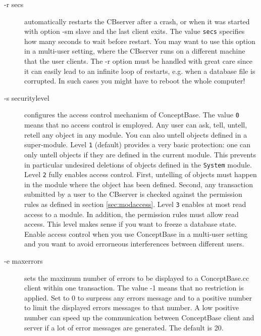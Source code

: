 \begin{description}
\item[-r secs] automatically restarts the CBserver after a crash, or when it was
started with option -sm slave and the last client exits.
The value {\tt secs} specifies how many seconds to wait before restart.
You may want to use this option in a multi-user setting, where the CBserver
runs on a different machine that the user clients. The -r option must be handled with
great care since it can easily lead to an infinite loop of restarts, e.g. when
a database file is corrupted. In such cases you might have to reboot the whole computer!


\item[-s securitylevel] configures the access control mechanism of
ConceptBase. The value {\tt 0} means that no access control is employed.
Any user can ask, tell, untell, retell any object in any module. You
can also untell objects defined in a super-module.
Level {\tt 1} (default)  provides a very basic protection: one can only
untell objects if they are defined in the current module. This
prevents in particular undesired deletions of objects defined in
the {\tt System} module.
Level {\tt 2} fully enables access control. First, untelling of objects must
happen in the module where the object has been defined. Second, any
transaction submitted by a user to the CBserver is checked against the
permission rules as defined in section \ref{sec:modaccess}.
Level {\tt 3} enables at most read access to a module. In addition, the permission rules
must allow read access. This level makes sense if you want to freeze a database state.
Enable access control
when you use ConceptBase in a multi-user setting and you want to avoid errorneous
interferences between different users.

\item[-e maxerrors] sets the maximum number of errors to be displayed to a ConceptBase.cc
client within one transaction. The value -1 means that no restriction is applied.
Set to 0 to surpress any errors message and to a positive number to limit the
displayed errors messages to that number. A low positive number can speed up the
communication between ConceptBase client and server if a lot of error messages
are generated. The default is 20.


\end{description}
